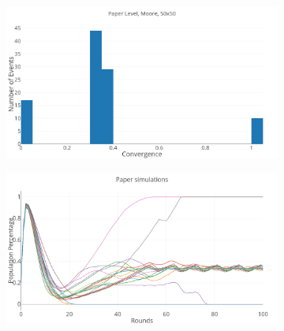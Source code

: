 \documentclass[a4paper, 11pt]{article}
\begin{document}
\begin{figure}[H]
	\begin{subfigure}{0.52\textwidth}
		\includegraphics[width=1\linewidth]{50x50_60RockDist_PaperHG}
	\end{subfigure}%
	\begin{subfigure}{0.52\textwidth}
		\includegraphics[width=1\linewidth]{50x50_60RockDist_IndividualPaper}
	\end{subfigure}
	

\end{figure}
\end{document}
